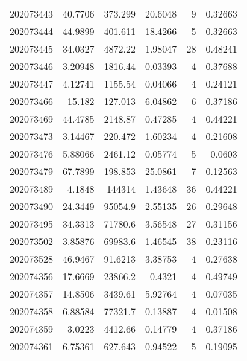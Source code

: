 \begin{tabular}{rrrrrr}
 202073443 &         40.7706  &      373.299  &           20.6048  &           9 & 0.32663 \\
 202073444 &         44.9899  &      401.611  &           18.4266  &           5 & 0.32663 \\
 202073445 &         34.0327  &     4872.22   &            1.98047 &          28 & 0.48241 \\
 202073446 &          3.20948 &     1816.44   &            0.03393 &           4 & 0.37688 \\
 202073447 &          4.12741 &     1155.54   &            0.04066 &           4 & 0.24121 \\
 202073466 &         15.182   &      127.013  &            6.04862 &           6 & 0.37186 \\
 202073469 &         44.4785  &     2148.87   &            0.47285 &           4 & 0.44221 \\
 202073473 &          3.14467 &      220.472  &            1.60234 &           4 & 0.21608 \\
 202073476 &          5.88066 &     2461.12   &            0.05774 &           5 & 0.0603  \\
 202073479 &         67.7899  &      198.853  &           25.0861  &           7 & 0.12563 \\
 202073489 &          4.1848  &   144314      &            1.43648 &          36 & 0.44221 \\
 202073490 &         24.3449  &    95054.9    &            2.55135 &          26 & 0.29648 \\
 202073495 &         34.3313  &    71780.6    &            3.56548 &          27 & 0.31156 \\
 202073502 &          3.85876 &    69983.6    &            1.46545 &          38 & 0.23116 \\
 202073528 &         46.9467  &       91.6213 &            3.38753 &           4 & 0.27638 \\
 202074356 &         17.6669  &    23866.2    &            0.4321  &           4 & 0.49749 \\
 202074357 &         14.8506  &     3439.61   &            5.92764 &           4 & 0.07035 \\
 202074358 &          6.88584 &    77321.7    &            0.13887 &           4 & 0.01508 \\
 202074359 &          3.0223  &     4412.66   &            0.14779 &           4 & 0.37186 \\
 202074361 &          6.75361 &      627.643  &            0.94522 &           5 & 0.19095 \\

\end{tabular}
